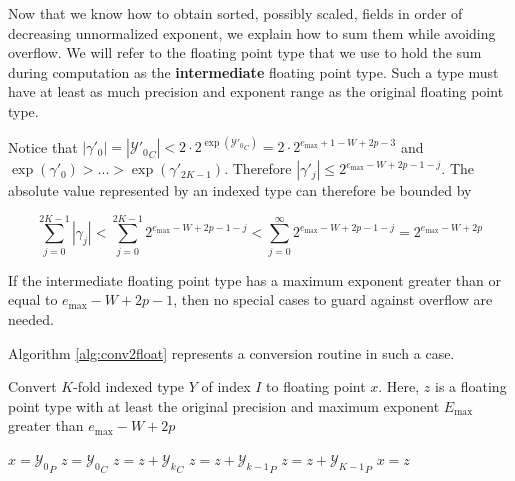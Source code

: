     Now that we know how to obtain sorted, possibly scaled, fields in order of
    decreasing unnormalized exponent, we explain how to sum them while avoiding
    overflow. We will refer to the floating point type that we use to hold the
    sum during computation as the \textbf{intermediate} floating point type.
    Such a type must have at least as much precision and exponent range as the
    original floating point type.

    Notice that $|\gamma'_0| = |{\mathcal{Y}'_0}_C| < 2 \cdot 2^{\exp({\mathcal{Y}'_0}_C)} = 2 \cdot 2^{e_{\max} + 1 - W + 2  p - 3}$ and $\exp(\gamma'_0) > ... > \exp(\gamma'_{2  K - 1})$.  Therefore $|\gamma'_j| \leq 2^{e_{\max} - W + 2  p - 1 - j}$. The absolute value represented by an indexed type can therefore be bounded by

    \begin{equation}
      \label{eq:maxindexedvalue}
      \sum\limits_{j = 0}^{2  K - 1} |\gamma_j| < \sum\limits_{j = 0}^{2  K - 1} 2^{e_{\max} - W + 2  p - 1 - j} < \sum\limits_{j = 0}^{\infty} 2^{e_{\max} - W + 2  p - 1 - j} = 2^{e_{\max} - W + 2  p}
    \end{equation}

    If the intermediate floating point type has a maximum exponent greater than
    or equal to $e_{\max} - W + 2  p - 1$, then no special cases to guard
    against overflow are needed.

    Algorithm \ref{alg:conv2float} represents a conversion routine in such a case.

    \begin{samepage}
    \begin{alg}
      Convert $K$-fold indexed type $Y$ of index $I$ to floating point $x$.
      Here, $z$ is a floating point type with at least the original precision
      and maximum exponent $E_{\max}$ greater than $e_{\max} - W + 2  p$
      \begin{algorithmic}[1]
            \State $x = {\mathcal{Y}_0}_P$
            \State \Return
          \EndIf
          \State $z = {\mathcal{Y}_0}_C$
            \State $z = z + {\mathcal{Y}_k}_C$
            \State $z = z + {\mathcal{Y}_{k - 1}}_P$
          \EndFor
          \State $z = z + {\mathcal{Y}_{K - 1}}_P$
          \State $x = z$ \label{alg:conv2float:conv}
        \EndFunction
      \end{algorithmic}
      \label{alg:conv2float}
    \end{alg}
    \end{samepage}

